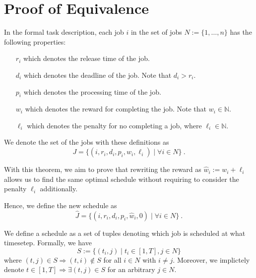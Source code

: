\section{Proof of Equivalence}

In the formal task description, each job $i$ in the set of jobs $N := \{1, \dots, n\}$ has the following properties:
\begin{itemize}
    \item[$r_i$] which denotes the release time of the job.
    \item[$d_i$] which denotes the deadline of the job. Note that $d_i > r_i$.
    \item[$p_i$] which denotes the processing time of the job.
    \item[$w_i$] which denotes the reward for completing the job. Note that $w_i\in \mathbb{N}$.
    \item[$\ell_i$] which denotes the penalty for no completing a job, where $\ell_i \in \mathbb{N}$.   
\end{itemize}

We denote the set of the jobs with these definitions as 
\begin{equation}
    J = \{
        \left (i, r_i, d_i, p_i, w_i, \ell_i \right ) \mid \forall i \in N
    \} \ .
\end{equation}

With this theorem, we aim to prove that rewriting the reward as $\hat{w}_i := w_i + \ell_i$ allows us to find the same optimal schedule without requiring to consider the penalty $\ell_i$ additionally.

Hence, we define the new schedule as
\begin{equation}
    \hat{J} = \{
        \left (i, r_i, d_i, p_i, \hat{w}_i, 0 \right ) \mid \forall i \in N
    \} \ .
    \label{eq:hat_J}
\end{equation}

We define a schedule as a set of tuples denoting which job is scheduled at what timesetep. Formally, we have
\begin{equation}
    S := \{
        (t_i, j) \mid t_i \in [1, T], j\in N
    \}
\end{equation} 
where $(t, j)\in S \Rightarrow (t, i) \notin S$ for all $i\in N$ with $i\neq j$. Moreover, we implictely denote $t\in [1, T] \Rightarrow \exists (t, j)\in S$ for an arbitrary $j\in N$.


